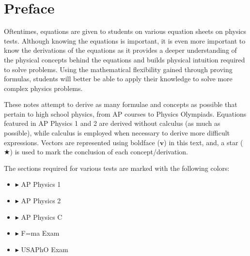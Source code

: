 \chapter*{Preface}

\qquad Oftentimes, equations are given to students on various equation sheets on physics tests. Although knowing the equations is important, it is even more important to know the derivations of the equations as it provides a deeper understanding of the physical concepts behind the equations and builds physical intuition required to solve problems. Using the mathematical flexibility gained through proving formulas, students will better be able to apply their knowledge to solve more complex physics problems.
\par These notes attempt to derive as many formulae and concepts as possible that pertain to high school physics, from AP courses to Physics Olympiads. Equations featured in AP Physics 1 and 2 are derived without calculus (as much as possible), while calculus is employed when necessary to derive more difficult expressions. Vectors are represented using boldface ($\textbf{v}$) in this text, and, a star ($\bigstar$) is used to mark the conclusion of each concept/derivation.
\par The sections required for various tests are marked with the following colors:
\begin{itemize}
\color{OrangeRed}
\item{$\blacktriangleright$} AP Physics 1
\color{RoyalBlue}
\item{$\blacktriangleright$} AP Physics 2
\color{PineGreen}
\item{$\blacktriangleright$} AP Physics C
\color{Goldenrod}
\item{$\blacktriangleright$} F=ma Exam
\color{Orchid}
\item{$\blacktriangleright$} USAPhO Exam
\end{itemize}

\mbox{}\linebreak
